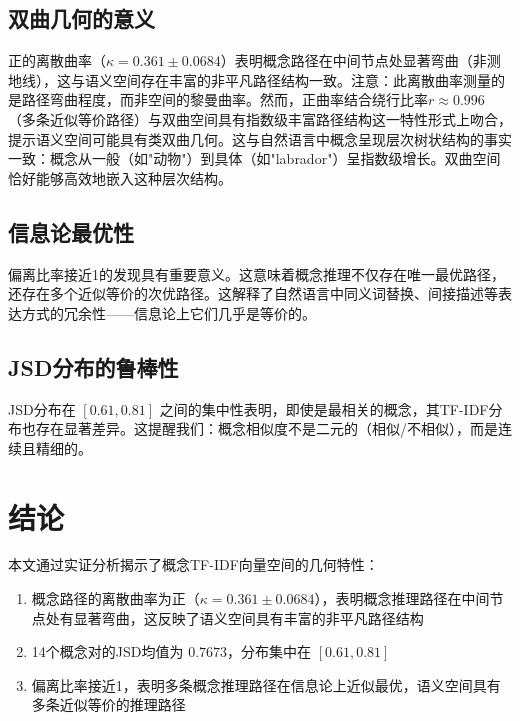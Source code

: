 \documentclass[UTF8,fontset=mac]{ctexart}
\begin{document}
\subsection{双曲几何的意义}\label{hyperbolic-geometry}

正的离散曲率（\(\kappa = 0.361 \pm 0.0684\)）表明概念路径在中间节点处显著弯曲（非测地线），这与语义空间存在丰富的非平凡路径结构一致。注意：此离散曲率测量的是路径弯曲程度，而非空间的黎曼曲率。然而，正曲率结合绕行比率\(r\approx 0.996\)（多条近似等价路径）与双曲空间具有指数级丰富路径结构这一特性形式上吻合，提示语义空间可能具有类双曲几何。这与自然语言中概念呈现层次树状结构的事实一致：概念从一般（如"动物"）到具体（如"labrador"）呈指数级增长。双曲空间恰好能够高效地嵌入这种层次结构。

\subsection{信息论最优性}\label{information-theoretic-optimality}

偏离比率接近1的发现具有重要意义。这意味着概念推理不仅存在唯一最优路径，还存在多个近似等价的次优路径。这解释了自然语言中同义词替换、间接描述等表达方式的冗余性------信息论上它们几乎是等价的。

\subsection{JSD分布的鲁棒性}\label{jsd-robustness}

JSD分布在 \([0.61, 0.81]\) 之间的集中性表明，即使是最相关的概念，其TF-IDF分布也存在显著差异。这提醒我们：概念相似度不是二元的（相似/不相似），而是连续且精细的。

\section{结论}\label{conclusion}

本文通过实证分析揭示了概念TF-IDF向量空间的几何特性：

\begin{enumerate}
\item
  概念路径的离散曲率为正（\(\kappa = 0.361 \pm 0.0684\)），表明概念推理路径在中间节点处有显著弯曲，这反映了语义空间具有丰富的非平凡路径结构
\item
  14个概念对的JSD均值为 \(0.7673\)，分布集中在 \([0.61, 0.81]\)
\item
  偏离比率接近1，表明多条概念推理路径在信息论上近似最优，语义空间具有多条近似等价的推理路径
\end{enumerate}
\end{document}
